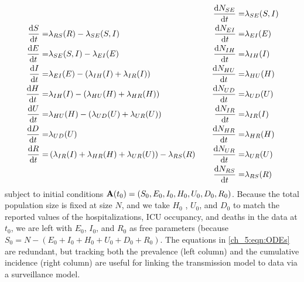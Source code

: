 \begin{equation}
\begin{aligned}
\frac{\mathrm{d} S}{\mathrm{d} t}    =&  \lambda_{RS}(R) - \lambda_{SE}(S, I) \\
\frac{\mathrm{d} E}{\mathrm{d} t}    =&  \lambda_{SE}(S, I) - \lambda_{EI}(E)    \\
\frac{\mathrm{d} I}{\mathrm{d} t}    =&  \lambda_{EI}(E) - \left( \lambda_{IH}(I) + \lambda_{IR}(I) \right)\\
\frac{\mathrm{d} H}{\mathrm{d} t}    =&  \lambda_{IH}(I) - \left( \lambda_{HU}(H) +  \lambda_{HR}(H) \right)\\
\frac{\mathrm{d} U}{\mathrm{d} t}    =&  \lambda_{HU}(H) - \left( \lambda_{UD}(U) + \lambda_{UR}(U) \right)\\
\frac{\mathrm{d} D}{\mathrm{d} t}    =&  \lambda_{UD}(U) \\
\frac{\mathrm{d} R}{\mathrm{d} t}    =&  \left( \lambda_{IR}(I) + \lambda_{HR}(H) + \lambda_{UR}(U) \right) - \lambda_{RS}(R)    \\
\end{aligned}
\qquad
\begin{aligned}
\frac{\mathrm{d} N_{SE}}{\mathrm{d} t}  =&  \lambda_{SE}(S, I) \\
\frac{\mathrm{d} N_{EI}}{\mathrm{d} t}  =&  \lambda_{EI}(E) \\
\frac{\mathrm{d} N_{IH}}{\mathrm{d} t}  =&  \lambda_{IH}(I) \\
\frac{\mathrm{d} N_{HU}}{\mathrm{d} t}  =&  \lambda_{HU}(H) \\
\frac{\mathrm{d} N_{UD}}{\mathrm{d} t}  =&  \lambda_{UD}(U) \\
\frac{\mathrm{d} N_{IR}}{\mathrm{d} t}  =&  \lambda_{IR}(I) \\
\frac{\mathrm{d} N_{HR}}{\mathrm{d} t}  =&  \lambda_{HR}(H) \\
\frac{\mathrm{d} N_{UR}}{\mathrm{d} t}  =&  \lambda_{UR}(U) \\
\frac{\mathrm{d} N_{RS}}{\mathrm{d} t}  =&  \lambda_{RS}(R)
\end{aligned}
\label{ch_5:eqn:ODEs}
\end{equation}
subject to initial conditions \( \mathbf{A}(t_0) = \left( S_0, E_0, I_0, H_0, U_0, D_0, R_0 \right) \).
Because the total population size is fixed at size \( N \), and we take \( H_0 \) , \( U_0 \), and \( D_0 \) to match the reported values of the hospitalizations, ICU occupancy, and deaths in the data at \( t_0 \), we are left with \( E_0 \), \( I_0 \), and \( R_0 \) as free parameters (because \( S_0 = N - \left( E_0 + I_0 + H_0 + U_0 + D_0 + R_0 \right) \).
The equations in \eqref{ch_5:eqn:ODEs} are redundant, but tracking both the prevalence (left column) and the cumulative incidence (right column) are useful for linking the transmission model to data via a surveillance model.

